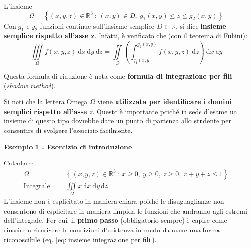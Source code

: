 \documentclass[a4paper]{article}
\newcommand{\definition}[1]{\textcolor{Red3}{\textbf{#1}}}
\newcommand{\example}[1]{\textcolor{Green4}{\textbf{#1}}}
\begin{document}
	\begin{boxdef}
		L'insieme:
		\begin{equation}\label{eq: insieme integrazione per fili}
			\Omega = \left\{\left(x,y,z\right) \in \mathbb{R}^{3} \: : \: \left(x,y\right) \in D, \: g_{1}\left(x,y\right) \le z \le g_{2}\left(x,y\right)\right\}
		\end{equation}
		Con $g_{1}$ e $g_{2}$ funzioni continue sull'insieme semplice $D \subset \mathbb{R}$, si dice \definition{insieme semplice rispetto all'asse z}. Infatti, è verificato che (con il teorema di Fubini):
		\begin{equation}\label{eq: formula di integrazione per fili}
			\displaystyle\iiint\limits_{\Omega} f\left(x,y,z\right) \:\mathrm{d}x\:\mathrm{d}y\:\mathrm{d}z
			=
			\displaystyle\iint\limits_{D}\left(\int_{g_{1}\left(x,y\right)}^{g_{2}\left(x,y\right)} f\left(x,y,z\right) \:\mathrm{d}z\right) \:\mathrm{d}x \:\mathrm{d}y
		\end{equation}
	\end{boxdef}

	\noindent
	Questa formula di riduzione è nota come \definition{formula di integrazione per fili} (\emph{shadow method}).\newline

	\noindent
	Si noti che la lettera Omega $\Omega$ viene \textbf{utilizzata per identificare i domini semplici rispetto all'asse} $z$. Questo è importante poiché in sede d'esame un insieme di questo tipo dovrebbe dare un punto di partenza allo studente per consentire di svolgere l'esercizio facilmente.

	\begin{flushleft}
		\example{\underline{Esempio 1 - Esercizio di introduzione}}
	\end{flushleft}
	Calcolare:
	\begin{equation*}
		\begin{array}{rcl}
			\Omega &=& \left\{\left(x,y,z\right) \in \mathbb{R}^{3} \: : \: x \ge 0, \: y \ge 0, \: z \ge 0, \: x+y+z \le 1\right\} \\ [1.5em]
			\text{Integrale} &=& \displaystyle\iiint\limits_{\Omega} x \:\mathrm{d}x\:\mathrm{d}y\:\mathrm{d}z
		\end{array}
	\end{equation*}
	L'insieme non è esplicitato in maniera chiara poiché le disuguaglianze non consentono di esplicitare in maniera limpida le funzioni che andranno agli estremi dell'integrale. Per cui, il \textbf{primo passo} (obbligatorio sempre) è capire come riuscire a riscrivere le condizioni d'esistenza in modo da avere una forma riconoscibile (eq. \ref{eq: insieme integrazione per fili}).
\end{document}
